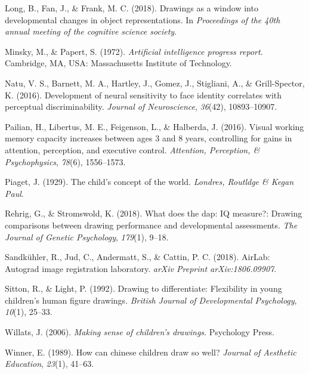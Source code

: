 \documentclass[
  english,
  man]{apa6}
\begin{document}
\leavevmode\hypertarget{ref-long2018drawings}{}%
Long, B., Fan, J., \& Frank, M. C. (2018). Drawings as a window into developmental changes in object representations. In \emph{Proceedings of the 40th annual meeting of the cognitive science society}.

\leavevmode\hypertarget{ref-minsky1972artificial}{}%
Minsky, M., \& Papert, S. (1972). \emph{Artificial intelligence progress report}. Cambridge, MA, USA: Massachusetts Institute of Technology.

\leavevmode\hypertarget{ref-natu2016development}{}%
Natu, V. S., Barnett, M. A., Hartley, J., Gomez, J., Stigliani, A., \& Grill-Spector, K. (2016). Development of neural sensitivity to face identity correlates with perceptual discriminability. \emph{Journal of Neuroscience}, \emph{36}(42), 10893--10907.

\leavevmode\hypertarget{ref-pailian2016visual}{}%
Pailian, H., Libertus, M. E., Feigenson, L., \& Halberda, J. (2016). Visual working memory capacity increases between ages 3 and 8 years, controlling for gains in attention, perception, and executive control. \emph{Attention, Perception, \& Psychophysics}, \emph{78}(6), 1556--1573.

\leavevmode\hypertarget{ref-piaget1929child}{}%
Piaget, J. (1929). The child's concept of the world. \emph{Londres, Routldge \& Kegan Paul}.

\leavevmode\hypertarget{ref-rehrig2018does}{}%
Rehrig, G., \& Stromswold, K. (2018). What does the dap: IQ measure?: Drawing comparisons between drawing performance and developmental assessments. \emph{The Journal of Genetic Psychology}, \emph{179}(1), 9--18.

\leavevmode\hypertarget{ref-sandkuhler2018}{}%
Sandkühler, R., Jud, C., Andermatt, S., \& Cattin, P. C. (2018). AirLab: Autograd image registration laboratory. \emph{arXiv Preprint arXiv:1806.09907}.

\leavevmode\hypertarget{ref-sitton1992drawing}{}%
Sitton, R., \& Light, P. (1992). Drawing to differentiate: Flexibility in young children's human figure drawings. \emph{British Journal of Developmental Psychology}, \emph{10}(1), 25--33.

\leavevmode\hypertarget{ref-willats2006making}{}%
Willats, J. (2006). \emph{Making sense of children's drawings}. Psychology Press.

\leavevmode\hypertarget{ref-winner1989can}{}%
Winner, E. (1989). How can chinese children draw so well? \emph{Journal of Aesthetic Education}, \emph{23}(1), 41--63.

\endgroup
\end{document}

